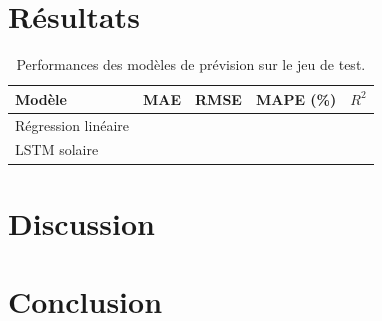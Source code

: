 \documentclass[11pt,a4paper]{article}
\begin{document}
\section{Résultats}
\begin{table}[h]
\centering
\begin{tabular}{lcccc}
\toprule
Modèle & MAE & RMSE & MAPE (\%) & $R^2$ \\
\midrule
Régression linéaire & & & & \\
LSTM solaire & & & & \\
\bottomrule
\end{tabular}
\caption{Performances des modèles de prévision sur le jeu de test.}
\end{table}


\section{Discussion}

\section{Conclusion}
\end{document}

